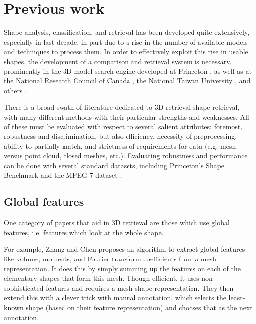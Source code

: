 \documentclass[../tech_report_1.tex]{subfiles}
\begin{document}
\section{Previous work}

Shape analysis, classification, and retrieval has been developed quite extensively, especially in last decade, in part due to a rise in the number of available models and techniques to process them. In order to effectively exploit this rise in usable shapes, the development of a comparison and retrieval system is necessary, prominently in the 3D model search engine developed at Princeton \cite{funkhouser2003search}, as well as at the National Research Council of Canada \cite{paquet2000description}, the National Taiwan University \cite{shen20033d}, and others \cite{suzuki2001search,tangelder2003polyhedral,vranic2003improvement}.

There is a broad swath of literature dedicated to 3D retrieval shape retrieval, with many different methods with their particular strengths and weaknesses. All of these must be evaluated with respect to several salient attributes: foremost, robustness and discrimination, but also efficiency, necessity of preprocessing, ability to partially match, and strictness of requirements for data (e.g. mesh versus point cloud, closed meshes, etc.). Evaluating robustness and performance can be done with several standard datasets, including Princeton's Shape Benchmark \cite{shilane2004princeton} and the MPEG-7 dataset \cite{jeannin1999description,bober2001mpeg}.

\subsection{Global features}

One category of papers that aid in 3D retrieval are those which use global features, i.e. features which look at the whole shape.

For example, Zhang and Chen \cite{zhang2001efficient} proposes an algorithm to extract global features like volume, moments, and Fourier transform coefficients from a mesh representation. It does this by simply summing up the features on each of the elementary shapes that form this mesh. Though efficient, it uses non-sophisticated features and requires a mesh shape representation. They then extend \cite{zhang2001indexing} this with a clever trick with manual annotation, which selects the least-known shape (based on their feature representation) and chooses that as the next annotation.
\end{document}
